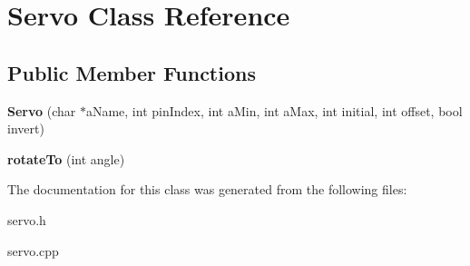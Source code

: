 \hypertarget{class_servo}{}\section{Servo Class Reference}
\label{class_servo}
\subsection*{Public Member Functions}
\begin{DoxyCompactItemize}
\item 
\mbox{\label{class_servo_abfe85df93271b5d0e54b9cee6c50abc6}} 
{\bfseries Servo} (char $\ast$a\+Name, int pin\+Index, int a\+Min, int a\+Max, int initial, int offset, bool invert)
\item 
\mbox{\label{class_servo_acc048b630aca0383409074e16ee521d4}} 
{\bfseries rotate\+To} (int angle)
\end{DoxyCompactItemize}


The documentation for this class was generated from the following files\+:\begin{DoxyCompactItemize}
\item 
servo.\+h\item 
servo.\+cpp\end{DoxyCompactItemize}
